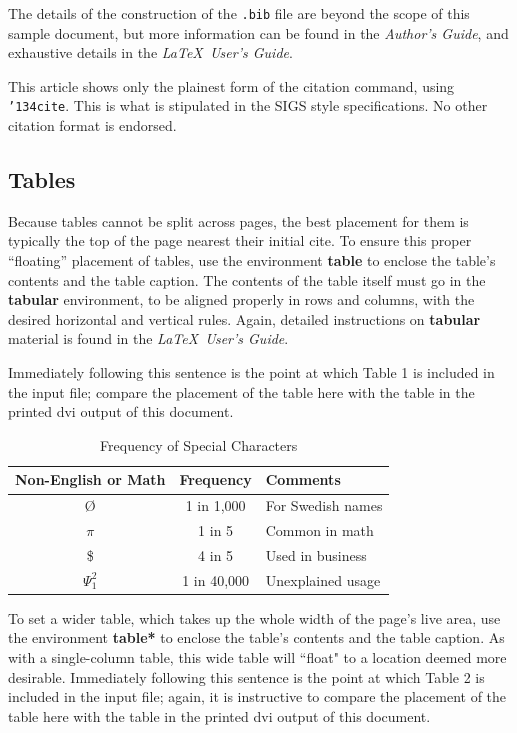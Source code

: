 \documentclass{vldb}
\begin{document}
The details of the construction of the \texttt{.bib} file
are beyond the scope of this sample document, but more
information can be found in the \textit{Author's Guide},
and exhaustive details in the \textit{\LaTeX\ User's
Guide}\cite{Lamport:LaTeX}.

This article shows only the plainest form
of the citation command, using \texttt{{\char'134}cite}.
This is what is stipulated in the SIGS style specifications.
No other citation format is endorsed.

\subsection{Tables}
Because tables cannot be split across pages, the best
placement for them is typically the top of the page
nearest their initial cite.  To
ensure this proper ``floating'' placement of tables, use the
environment \textbf{table} to enclose the table's contents and
the table caption.  The contents of the table itself must go
in the \textbf{tabular} environment, to
be aligned properly in rows and columns, with the desired
horizontal and vertical rules.  Again, detailed instructions
on \textbf{tabular} material
is found in the \textit{\LaTeX\ User's Guide}.

Immediately following this sentence is the point at which
Table 1 is included in the input file; compare the
placement of the table here with the table in the printed
dvi output of this document.

\begin{table}
\centering
\caption{Frequency of Special Characters}
\begin{tabular}{|c|c|l|} \hline
Non-English or Math&Frequency&Comments\\ \hline
\O & 1 in 1,000& For Swedish names\\ \hline
$\pi$ & 1 in 5& Common in math\\ \hline
\$ & 4 in 5 & Used in business\\ \hline
$\Psi^2_1$ & 1 in 40,000& Unexplained usage\\
\hline\end{tabular}
\end{table}

To set a wider table, which takes up the whole width of
the page's live area, use the environment
\textbf{table*} to enclose the table's contents and
the table caption.  As with a single-column table, this wide
table will ``float" to a location deemed more desirable.
Immediately following this sentence is the point at which
Table 2 is included in the input file; again, it is
instructive to compare the placement of the
table here with the table in the printed dvi
output of this document.
\end{document}
